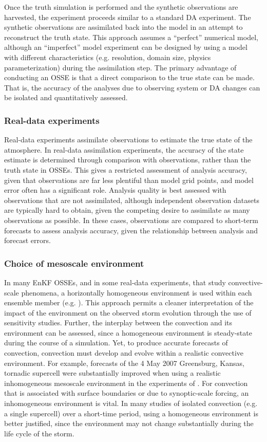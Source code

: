 Once the truth simulation is performed and the synthetic observations are harvested, the experiment proceeds similar to a standard DA experiment. The synthetic observations are assimilated back into the model in an attempt to reconstruct the truth state. This approach assumes a “perfect” numerical model, although an “imperfect” model experiment can be designed by using a model with different characteristics (e.g. resolution, domain size, physics parameterization) during the assimilation step. The primary advantage of conducting an OSSE is that a direct comparison to the true state can be made. That is, the accuracy of the analyses due to observing system or DA changes can be isolated and quantitatively assessed.

\subsubsection{Real-data experiments}
Real-data experiments assimilate observations to estimate the true state of the atmosphere. In real-data assimilation experiments, the accuracy of the state estimate is determined through comparison with observations, rather than the truth state in OSSEs. This gives a restricted assessment of analysis accuracy, given that observations are far less plentiful than model grid points, and model error often has a significant role. Analysis quality is best assessed with observations that are not assimilated, although independent observation datasets are typically hard to obtain, given the competing desire to assimilate as many observations as possible. In these cases, observations are compared to short-term forecasts to assess analysis accuracy, given the relationship between analysis and forecast errors.

\subsubsection{Choice of mesoscale environment}
In many EnKF OSSEs, and in some real-data experiments, that study convective-scale phenomena, a horizontally homogeneous environment is used within each ensemble member (e.g. \citealt{aksoyetal09,dawsonetal12}). This approach permits a cleaner interpretation of the impact of the environment on the observed storm evolution through the use of sensitivity studies. Further, the interplay between the convection and its environment can be assessed, since a homogeneous environment is steady-state during the course of a simulation. Yet, to produce accurate forecasts of convection, convection must develop and evolve within a realistic convective environment. For example, forecasts of the 4 May 2007 Greensburg, Kansas, tornadic supercell were substantially improved when using a realistic inhomogeneous mesoscale environment in the experiments of \citet{stensrudgao10}. For convection that is associated with surface boundaries or due to synoptic-scale forcing, an inhomogeneous environment is vital. In many studies of isolated convection (e.g. a single supercell) over a short-time period, using a homogeneous environment is better justified, since the environment may not change substantially during the life cycle of the storm.

